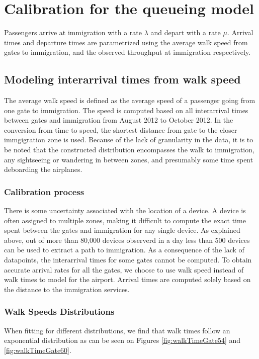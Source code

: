\documentclass[11pt,onecolumn]{IEEEtran}
\begin{document}
\clearpage
\section{Calibration for the queueing model}
Passengers arrive at immigration with a rate $\lambda$ and depart with a rate $\mu$.
Arrival times and departure times are parametrized using the average walk speed from gates to immigration, and the observed throughput at immigration respectively.\\
\subsection{Modeling interarrival times from walk speed}
The average walk speed is defined  as the average speed of a passenger going from one gate to immigration.
The speed is computed based on all interarrival times between gates and immigration from August 2012 to October 2012. In the conversion from time to speed, the shortest distance from gate to the closer immgigration zone is used.
Because of the lack of granularity in the data, it is to be noted that the constructed distribution encompasses the walk to immigration, any sightseeing or wandering in between zones, and presumably some time spent deboarding the airplanes.\\ 
\subsubsection{Calibration process}
There is some uncertainty associated with the location of a device.
A device is often assigned to multiple zones, making it difficult to compute the exact time spent between the gates and immigration for any single device. As explained above, out of more than 80,000 devices observerd in a day less than 500 devices can be used to extract a path to immigration.
As a consequence of the lack of datapoints, the interarrival times for some gates cannot be computed. 
To obtain accurate arrival rates for all the gates, we choose to use walk speed instead of walk times to model for the airport. Arrival times are computed solely based on the distance to the immigration services. \\
\subsubsection{Walk Speeds Distributions}
When fitting for different distributions, we find that walk times follow an exponential distribution as can be seen on Figures  \ref{fig:walkTimeGate54} and \ref{fig:walkTimeGate60}.
\end{document}
